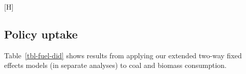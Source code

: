 \documentclass[
  letterpaper,
  DIV=11,
  numbers=noendperiod]{scrartcl}
\makeatletter
\renewenvironment{figure}%
   {\renewcommand\familydefault\sfdefault
    \@float{figure}}
   {\end@float}
\makeatother
\begin{document}
\begin{figure}[H]


\caption{\label{fig-flowchart}Flow chart of BHET study participation at
the participant, household, and village levels across study years.}

\end{figure}%

\newpage

\newpage

\subsection{Policy uptake}\label{policy-uptake-1}

Table~\ref{tbl-fuel-did} shows results from applying our extended
two-way fixed effects models (in separate analyses) to coal and biomass
consumption.
\end{document}
